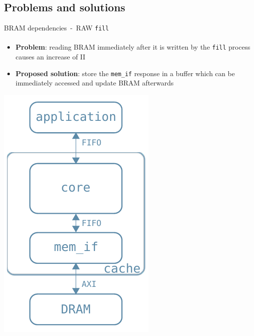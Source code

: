 \documentclass{beamer}
\begin{document}
\subsection{Problems and solutions}
\begin{frame}{BRAM dependencies~-~RAW \texttt{fill}}
	\framesubtitle{}
	\begin{minipage}{.7\textwidth}
		\begin{itemize}[<+->]
			\item \textbf{Problem}:
				reading BRAM immediately after it is written
				by the \texttt{fill} process causes an increase
				of II
			\item \textbf{Proposed solution}:
				store the \texttt{mem\_if} response in a buffer
				which can be immediately accessed and update BRAM
				afterwards
		\end{itemize}
	\end{minipage}
	\begin{minipage}{.28\textwidth}
		\begin{center}
			\includegraphics[width=.9\textwidth,height=.9\textheight,keepaspectratio]{internal_arch.pdf}
		\end{center}
	\end{minipage}
\end{frame}
\end{document}
